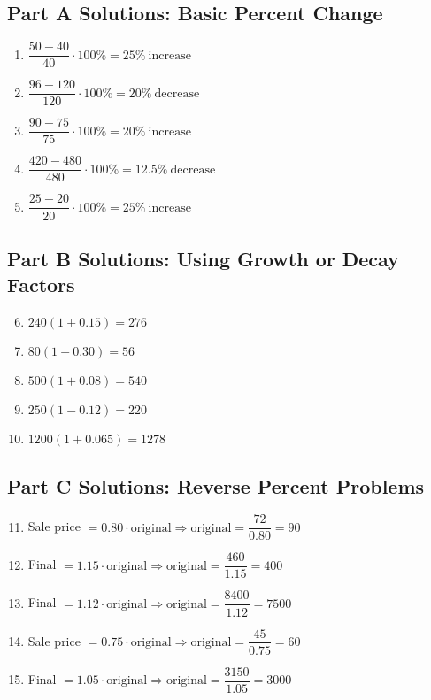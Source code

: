 \documentclass[12pt]{article}
\begin{document}
\subsection*{Part A Solutions: Basic Percent Change}
\begin{enumerate}
  \item \(\dfrac{50-40}{40}\cdot100\% = \boxed{25\%\ \text{increase}}\)
  \item \(\dfrac{96-120}{120}\cdot100\% = \boxed{20\%\ \text{decrease}}\)
  \item \(\dfrac{90-75}{75}\cdot100\% = \boxed{20\%\ \text{increase}}\)
  \item \(\dfrac{420-480}{480}\cdot100\% = \boxed{12.5\%\ \text{decrease}}\)
  \item \(\dfrac{25-20}{20}\cdot100\% = \boxed{25\%\ \text{increase}}\)
\end{enumerate}

\subsection*{Part B Solutions: Using Growth or Decay Factors}
\begin{enumerate}
  \setcounter{enumi}{5}
  \item \(240(1+0.15)=\boxed{276}\)
  \item \(80(1-0.30)=\boxed{56}\)
  \item \(500(1+0.08)=\boxed{540}\)
  \item \(250(1-0.12)=\boxed{220}\)
  \item \(1200(1+0.065)=\boxed{1278}\)
\end{enumerate}

\subsection*{Part C Solutions: Reverse Percent Problems}
\begin{enumerate}
  \setcounter{enumi}{10}
  \item Sale price \(=0.80\cdot \text{original}\Rightarrow \text{original}=\dfrac{72}{0.80}=\boxed{90}\)
  \item Final \(=1.15\cdot \text{original}\Rightarrow \text{original}=\dfrac{460}{1.15}=\boxed{400}\)
  \item Final \(=1.12\cdot \text{original}\Rightarrow \text{original}=\dfrac{8400}{1.12}=\boxed{7500}\)
  \item Sale price \(=0.75\cdot \text{original}\Rightarrow \text{original}=\dfrac{45}{0.75}=\boxed{60}\)
  \item Final \(=1.05\cdot \text{original}\Rightarrow \text{original}=\dfrac{3150}{1.05}=\boxed{3000}\)
\end{enumerate}
\end{document}

